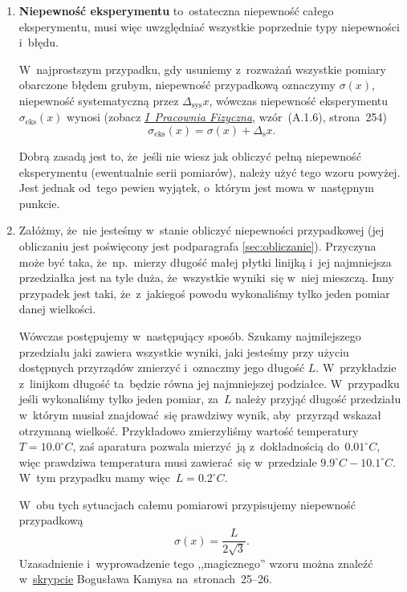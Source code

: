 \documentclass[a4paper,11pt]{article}
\begin{document}
\begin{enumerate}
\item \textbf{Niepewność eksperymentu} to~ostateczna niepewność całego
  eksperymentu, musi więc uwzględniać wszystkie poprzednie typy
  niepewności i~błędu.

  W~najprostszym przypadku, gdy usuniemy z~rozważań wszystkie pomiary
  obarczone błędem grubym, niepewność przypadkową oznaczymy
  $\sigma( x )$, niepewność systematyczną przez
  $\Delta_{ \textrm{sys} } x$, wówczas niepewność eksperymentu
  $\sigma_{ \textrm{eks} }( x )$ wynosi (zobacz
  \href{http://www.1pf.if.uj.edu.pl/documents/5046939/5227638/skrypt.pdf}{\emph{I~Pracownia
      Fizyczna}}, wzór~(A.1.6), strona~254)
  \begin{equation}
    \label{eq:1}
    \sigma_{ \textrm{eks} }( x ) = \sigma( x ) + \Delta_{ \textrm{s} } x.
  \end{equation}

  Dobrą zasadą jest to, że~jeśli nie wiesz jak obliczyć pełną
  niepewność eksperymentu (ewentualnie serii pomiarów), należy użyć
  tego wzoru powyżej. Jest jednak od~tego pewien wyjątek, o~którym
  jest mowa w~następnym punkcie.

\item Załóżmy, że~nie jesteśmy w~stanie obliczyć niepewności
  przypadkowej (jej obliczaniu jest poświęcony jest podparagrafa
  \eqref{sec:obliczanie}). Przyczyna może być taka, że~np.~mierzy
  długość małej płytki linijką i~jej najmniejsza przedziałka jest na
  tyle duża, że~wszystkie wyniki~się w~niej mieszczą. Inny przypadek
  jest taki, że~z~jakiegoś powodu wykonaliśmy tylko jeden pomiar danej
  wielkości.

  Wówczas postępujemy w~następujący sposób. Szukamy najmilejszego
  przedziału jaki zawiera wszystkie wyniki, jaki jesteśmy przy użyciu
  dostępnych przyrządów zmierzyć i~oznaczmy jego długość $L$.
  W~przykładzie z~linijkom długość ta~będzie równa jej najmniejszej
  podziałce. W~przypadku jeśli wykonaliśmy tylko jeden pomiar, za~$L$
  należy przyjąć długość przedziału w~którym musiał znajdować~się
  prawdziwy wynik, aby~przyrząd wskazał otrzymaną wielkość.
  Przykładowo zmierzyliśmy wartość temperatury
  $T = 10.0 ^{ \circ }\si{C}$, zaś aparatura pozwala mierzyć~ją
  z~dokładnością do~$0.01^{ \circ }\si{C}$, więc prawdziwa
  temperatura musi zawierać~się w~przedziale
  $9.9^{ \circ }\si{C} - 10.1 ^{ \circ }\si{C}$. W~tym przypadku mamy
  więc~$L = 0.2 ^{ \circ }\si{C}$.

  W~obu tych sytuacjach całemu pomiarowi przypisujemy niepewność
  przypadkową
  \begin{equation}
    \label{eq:2}
    \sigma( x ) = \frac{ L }{ 2 \sqrt{ 3 } }.
  \end{equation}
  Uzasadnienie i~wyprowadzenie tego ,,magicznego'' wzoru można znaleźć
  w~\href{http://users.uj.edu.pl/\~ufkamys/BK/smop1N\_h.pdf}{skrypcie}
  Bogusława Kamysa na~stronach~25--26.


\end{enumerate}
\end{document}

